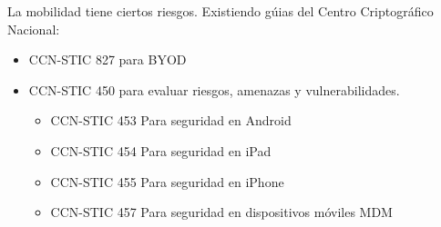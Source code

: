 La mobilidad tiene ciertos riesgos. Existiendo gúias del Centro Criptográfico Nacional:
\begin{itemize}
    \item CCN-STIC 827 para BYOD
    \item CCN-STIC 450 para evaluar riesgos, amenazas y vulnerabilidades.
    \begin{itemize}
        \item CCN-STIC 453 Para seguridad en Android
        \item CCN-STIC 454 Para seguridad en iPad
        \item CCN-STIC 455 Para seguridad en iPhone
        \item CCN-STIC 457 Para seguridad en  dispositivos móviles MDM
    \end{itemize}
\end{itemize}